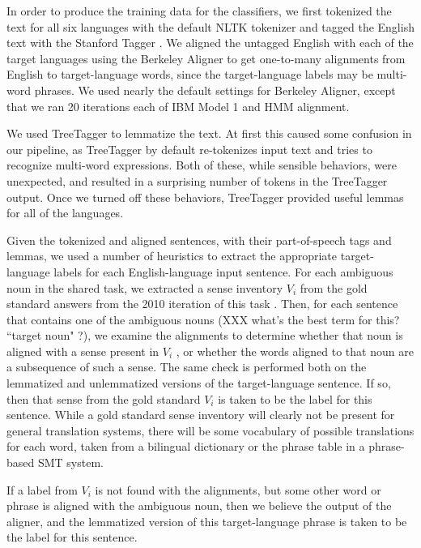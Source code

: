 \documentclass[11pt,letterpaper]{article}
\begin{document}
In order to produce the training data for the classifiers, we first tokenized
the text for all six languages with the default NLTK tokenizer and tagged the
English text with the Stanford Tagger
\cite{Toutanova03feature-richpart-of-speech}. We aligned the untagged English
with each of the target languages using the Berkeley Aligner
\cite{denero-klein:2007:ACLMain} to get one-to-many alignments from English to
target-language words, since the target-language labels may be multi-word
phrases. We used nearly the default settings for Berkeley Aligner, except that
we ran 20 iterations each of IBM Model 1 and HMM alignment.

We used TreeTagger \cite{Schmid95improvementsin} to lemmatize the text. At
first this caused some confusion in our pipeline, as TreeTagger by default
re-tokenizes input text and tries to recognize multi-word expressions. Both of
these, while sensible behaviors, were unexpected, and resulted in a surprising 
number of tokens in the TreeTagger output. Once we turned off these behaviors,
TreeTagger provided useful lemmas for all of the languages.

Given the tokenized and aligned sentences, with their part-of-speech tags and
lemmas, we used a number of heuristics to extract the appropriate
target-language labels for each English-language input sentence.  For each
ambiguous noun in the shared task, we extracted a sense inventory $V_i$ from
the gold standard answers from the 2010 iteration of this task
\cite{lefever-hoste:2009:SEW}. Then, for each sentence that contains one of the
ambiguous nouns (XXX what's the best term for this?  ``target noun" ?), we
examine the alignments to determine whether that noun is aligned with a sense
present in $V_i$ , or whether the words aligned to that noun are a subsequence
of such a sense. The same check is performed both on the lemmatized and
unlemmatized versions of the target-language sentence. If so, then that sense
from the gold standard $V_i$ is taken to be the label for this sentence. While
a gold standard sense inventory will clearly not be present for general
translation systems, there will be some vocabulary of possible translations for
each word, taken from a bilingual dictionary or the phrase table in a
phrase-based SMT system.

If a label from $V_i$ is not found with the alignments, but some other word or
phrase is aligned with the ambiguous noun, then we believe the output of the
aligner, and the lemmatized version of this target-language phrase is taken to
be the label for this sentence.
\end{document}
